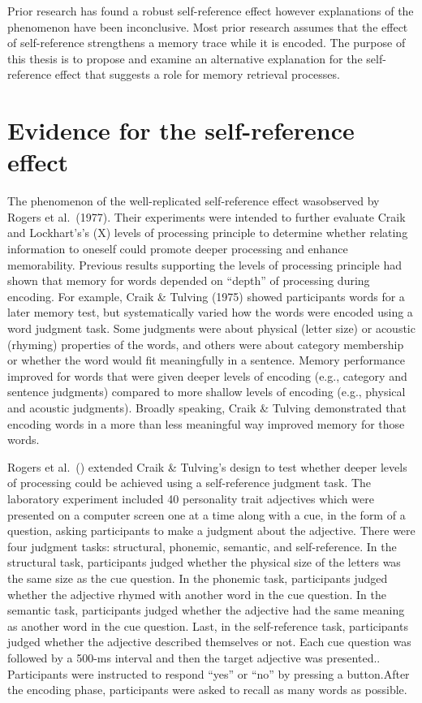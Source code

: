 \documentclass[
  man,floatsintext]{apa6}
\begin{document}
Prior research has found a robust self-reference effect however explanations of the phenomenon have been inconclusive. Most prior research assumes that the effect of self-reference strengthens a memory trace while it is encoded. The purpose of this thesis is to propose and examine an alternative explanation for the self-reference effect that suggests a role for memory retrieval processes.

\hypertarget{evidence-for-the-self-reference-effect}{%
\section{Evidence for the self-reference effect}\label{evidence-for-the-self-reference-effect}}

The phenomenon of the well-replicated self-reference effect wasobserved by Rogers et al.~(1977). Their experiments were intended to further evaluate Craik and Lockhart's's (X) levels of processing principle to determine whether relating information to oneself could promote deeper processing and enhance memorability. Previous results supporting the levels of processing principle had shown that memory for words depended on ``depth'' of processing during encoding. For example, Craik \& Tulving (1975) showed participants words for a later memory test, but systematically varied how the words were encoded using a word judgment task. Some judgments were about physical (letter size) or acoustic (rhyming) properties of the words, and others were about category membership or whether the word would fit meaningfully in a sentence. Memory performance improved for words that were given deeper levels of encoding (e.g., category and sentence judgments) compared to more shallow levels of encoding (e.g., physical and acoustic judgments). Broadly speaking, Craik \& Tulving demonstrated that encoding words in a more than less meaningful way improved memory for those words.

Rogers et al.~() extended Craik \& Tulving's design to test whether deeper levels of processing could be achieved using a self-reference judgment task. The laboratory experiment included 40 personality trait adjectives which were presented on a computer screen one at a time along with a cue, in the form of a question, asking participants to make a judgment about the adjective. There were four judgment tasks: structural, phonemic, semantic, and self-reference. In the structural task, participants judged whether the physical size of the letters was the same size as the cue question. In the phonemic task, participants judged whether the adjective rhymed with another word in the cue question. In the semantic task, participants judged whether the adjective had the same meaning as another word in the cue question. Last, in the self-reference task, participants judged whether the adjective described themselves or not. Each cue question was followed by a 500-ms interval and then the target adjective was presented.. Participants were instructed to respond ``yes'' or ``no'' by pressing a button.After the encoding phase, participants were asked to recall as many words as possible.
\end{document}
